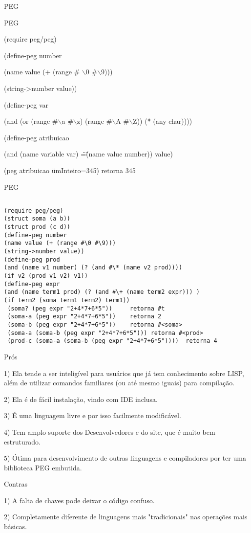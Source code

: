 \documentclass{beamer}
\begin{document}


\begin{frame}[fragile]{PEG}

PEG

(require peg/peg)

(define-peg number

            (name value (+ (range \# $\backslash$0 \#$\backslash$9)))
            
            (string->number value))
            
(define-peg var

            (and (or (range \#$\backslash$a \#$\backslash$z) (range \#$\backslash$A \#$\backslash$Z)) (* (any-char))))
            

(define-peg atribuicao

            (and (name variable var) \"=\" (name value number)) value)
            
(peg atribuicao \"umInteiro=345\") retorna 345

\end{frame}



\begin{frame}[fragile]{PEG}
\begin{verbatim}

(require peg/peg)
(struct soma (a b))
(struct prod (c d))
(define-peg number
(name value (+ (range #\0 #\9)))
(string->number value))
(define-peg prod
(and (name v1 number) (? (and #\* (name v2 prod))))
(if v2 (prod v1 v2) v1))
(define-peg expr
(and (name term1 prod) (? (and #\+ (name term2 expr))) )
(if term2 (soma term1 term2) term1))
 (soma? (peg expr "2+4*7+6*5"))     retorna #t
 (soma-a (peg expr "2+4*7+6*5"))    retorna 2
 (soma-b (peg expr "2+4*7+6*5"))    retorna #<soma>
 (soma-a (soma-b (peg expr "2+4*7+6*5"))) retorna #<prod>
 (prod-c (soma-a (soma-b (peg expr "2+4*7+6*5"))))  retorna 4
\end{verbatim}
\end{frame}


\begin{frame}{Prós}

1) Ela tende a ser inteligível para usuários que já tem conhecimento sobre LISP, além de utilizar comandos familiares (ou até mesmo iguais) para compilação.

2) Ela é de fácil instalação, vindo com IDE inclusa.

3) É uma linguagem livre e por isso facilmente modificável.

4) Tem amplo suporte dos Desenvolvedores e do site, que é muito bem estruturado.

5) Ótima para desenvolvimento de outras linguagens e compiladores por ter uma biblioteca PEG embutida.


\end{frame}
\begin{frame}{Contras}

1) A falta de chaves pode deixar o código confuso.

2) Completamente diferente de linguagens mais "tradicionais" nas operações mais básicas.


\end{frame}
\end{document}

